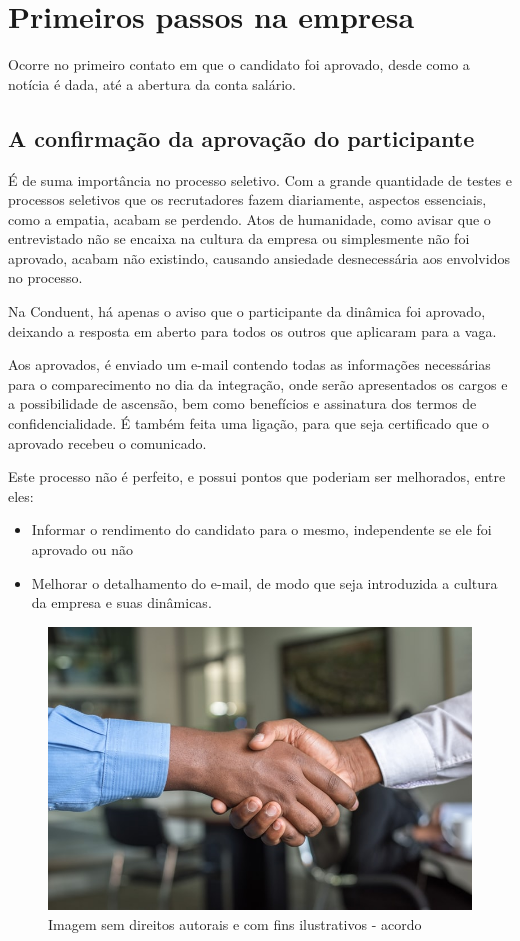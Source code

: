 \documentclass[12pt]{article}
\begin{document}
\newpage


\section{Primeiros passos na empresa}
Ocorre no primeiro contato em que o candidato foi aprovado, desde como a notícia é dada, até a abertura da conta salário.


\subsection{A confirmação da aprovação do participante}
É de suma importância no processo seletivo. Com a grande quantidade de testes e processos seletivos que os recrutadores fazem diariamente, aspectos essenciais, como a empatia, acabam se perdendo. Atos de humanidade, como avisar que o entrevistado não se encaixa na cultura da empresa ou simplesmente não foi aprovado, acabam não existindo, causando ansiedade desnecessária aos envolvidos no processo.

Na Conduent, há apenas o aviso que o participante da dinâmica foi aprovado, deixando a resposta em aberto para todos os outros que aplicaram para a vaga.

Aos aprovados, é enviado um e-mail contendo todas as informações necessárias para o comparecimento no dia da integração, onde serão apresentados os cargos e a possibilidade de ascensão, bem como benefícios e assinatura dos termos de confidencialidade. É também feita uma ligação, para que seja certificado que o aprovado recebeu o comunicado.

Este processo não é perfeito, e possui pontos que poderiam ser melhorados, entre eles:

\begin{itemize}
\item Informar o rendimento do candidato para o mesmo, independente se ele foi aprovado ou não
\item  Melhorar o detalhamento do e-mail, de modo que seja introduzida a cultura da empresa e suas dinâmicas.
\end{itemize}

\begin{figure}[h]
	\centering
	\includegraphics[scale=0.4]{build/images/maos.jpg}
	\caption{Imagem sem direitos autorais e com fins ilustrativos - acordo}
\end{figure}
\end{document}

